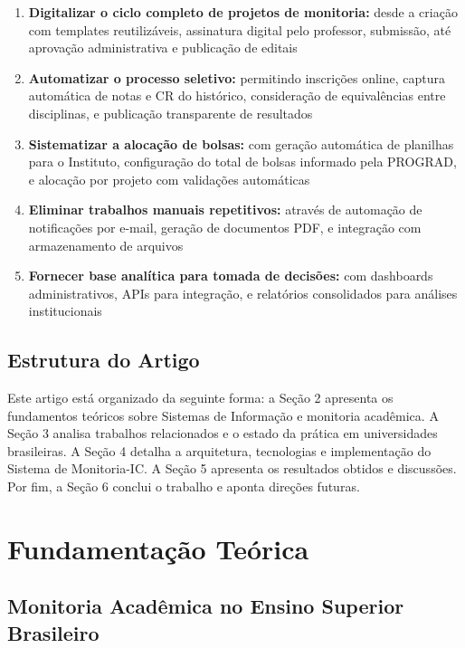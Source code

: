 \documentclass[portuguese]{sbc2025}%
\begin{document}
\begin{enumerate}
  \item \textbf{Digitalizar o ciclo completo de projetos de monitoria:} desde a criação com templates reutilizáveis, assinatura digital pelo professor, submissão, até aprovação administrativa e publicação de editais

  \item \textbf{Automatizar o processo seletivo:} permitindo inscrições online, captura automática de notas e CR do histórico, consideração de equivalências entre disciplinas, e publicação transparente de resultados

  \item \textbf{Sistematizar a alocação de bolsas:} com geração automática de planilhas para o Instituto, configuração do total de bolsas informado pela PROGRAD, e alocação por projeto com validações automáticas

  \item \textbf{Eliminar trabalhos manuais repetitivos:} através de automação de notificações por e-mail, geração de documentos PDF, e integração com armazenamento de arquivos

  \item \textbf{Fornecer base analítica para tomada de decisões:} com dashboards administrativos, APIs para integração, e relatórios consolidados para análises institucionais
\end{enumerate}

\subsection{Estrutura do Artigo}

Este artigo está organizado da seguinte forma: a Seção 2 apresenta os fundamentos teóricos sobre Sistemas de Informação e monitoria acadêmica. A Seção 3 analisa trabalhos relacionados e o estado da prática em universidades brasileiras. A Seção 4 detalha a arquitetura, tecnologias e implementação do Sistema de Monitoria-IC. A Seção 5 apresenta os resultados obtidos e discussões. Por fim, a Seção 6 conclui o trabalho e aponta direções futuras.

\section{Fundamentação Teórica}
\label{sec:background}

\subsection{Monitoria Acadêmica no Ensino Superior Brasileiro}
\end{document}
